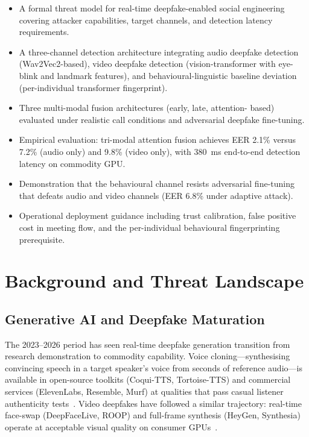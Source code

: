 \documentclass[sigconf,nonacm]{acmart}
\begin{document}
\begin{itemize}
  \item A formal threat model for real-time deepfake-enabled social
        engineering covering attacker capabilities, target channels,
        and detection latency requirements.
  \item A three-channel detection architecture integrating audio
        deepfake detection (Wav2Vec2-based), video deepfake detection
        (vision-transformer with eye-blink and landmark features),
        and behavioural-linguistic baseline deviation (per-individual
        transformer fingerprint).
  \item Three multi-modal fusion architectures (early, late, attention-
        based) evaluated under realistic call conditions and adversarial
        deepfake fine-tuning.
  \item Empirical evaluation: tri-modal attention fusion achieves
        EER 2.1\% versus 7.2\% (audio only) and 9.8\% (video only),
        with 380~ms end-to-end detection latency on commodity GPU.
  \item Demonstration that the behavioural channel resists adversarial
        fine-tuning that defeats audio and video channels (EER 6.8\%
        under adaptive attack).
  \item Operational deployment guidance including trust calibration,
        false positive cost in meeting flow, and the per-individual
        behavioural fingerprinting prerequisite.
\end{itemize}

\section{Background and Threat Landscape}

\subsection{Generative AI and Deepfake Maturation}

The 2023--2026 period has seen real-time deepfake generation transition
from research demonstration to commodity capability. Voice
cloning---synthesising convincing speech in a target speaker's voice from
seconds of reference audio---is available in open-source toolkits
(Coqui-TTS, Tortoise-TTS) and commercial services (ElevenLabs, Resemble,
Murf) at qualities that pass casual listener
authenticity tests~\cite{khan2024voicecloning}. Video deepfakes have
followed a similar trajectory: real-time face-swap (DeepFaceLive,
ROOP) and full-frame synthesis (HeyGen, Synthesia) operate at
acceptable visual quality on consumer GPUs~\cite{rana2024videosurv}.
\end{document}
